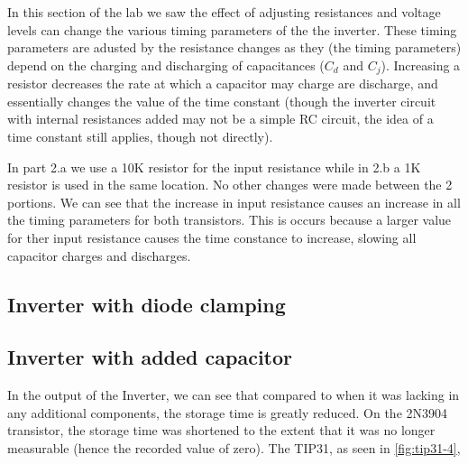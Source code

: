 \documentclass[10pt]{article}
\begin{document}
In this section of the lab we saw the effect of adjusting resistances and
voltage levels can change the various timing parameters of the the
inverter. These timing parameters are adusted by the resistance changes as
they (the timing parameters) depend on the charging and discharging of
capacitances ($C_d$ and $C_j$). Increasing a resistor decreases the rate
at which a capacitor may charge are discharge, and essentially changes the
value of the time constant (though the inverter circuit with internal
resistances added may not be a simple RC circuit, the idea of a time
constant still applies, though not directly). 

In part 2.a we use a 10K resistor for the input resistance while in 2.b a
1K resistor is used in the same location. No other changes were made
between the 2 portions. We can see that the increase in input resistance
causes an increase in all the timing parameters for both transistors. This
is occurs because a larger value for ther input resistance causes the time
constance to increase, slowing all capacitor charges and discharges.

\subsection{Inverter with diode clamping}




\subsection{Inverter with added capacitor}

In the output of the Inverter, we can see that compared to when it was
lacking in any additional components, the storage time is greatly reduced.
On the 2N3904 transistor, the storage time was shortened to the extent
that it was no longer measurable (hence the recorded value of zero). The
TIP31, as seen in \autoref{fig:tip31-4}, 


%
\end{document}
